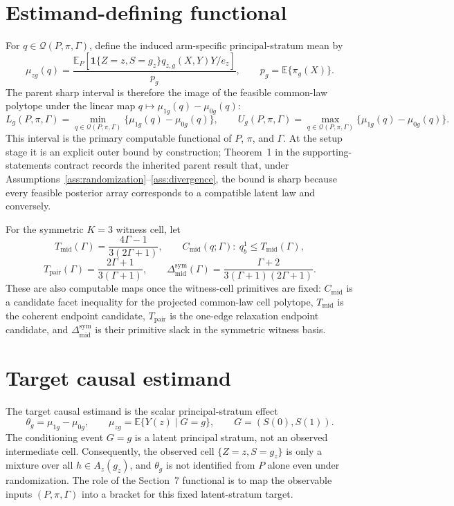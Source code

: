 \documentclass[11pt]{article}
\newcommand{\E}{\mathbb{E}}
\newcommand{\one}{\mathbf{1}}
\theoremstyle{definition}
\theoremstyle{plain}
\theoremstyle{remark}
\begin{document}
\section{Estimand-defining functional}
For \(q\in\mathcal Q(P,\pi,\Gamma)\), define the induced arm-specific principal-stratum mean by
\[
  \mu_{zg}(q)
  =
  \frac{\E_P\!\left[\one\{Z=z,S=g_z\}q_{z,g}(X,Y)Y/e_z\right]}{p_g},
  \qquad
  p_g=\E\{\pi_g(X)\}.
\]
The parent sharp interval is therefore the image of the feasible common-law polytope under the linear map \(q\mapsto \mu_{1g}(q)-\mu_{0g}(q)\):
\[
  L_g(P,\pi,\Gamma)
  =
  \min_{q\in\mathcal Q(P,\pi,\Gamma)}\{\mu_{1g}(q)-\mu_{0g}(q)\},
  \qquad
  U_g(P,\pi,\Gamma)
  =
  \max_{q\in\mathcal Q(P,\pi,\Gamma)}\{\mu_{1g}(q)-\mu_{0g}(q)\}.
\]
This interval is the primary computable functional of \(P\), \(\pi\), and \(\Gamma\).  At the setup stage it is an explicit outer bound by construction; Theorem~1 in the supporting-statements contract records the inherited parent result that, under Assumptions~\ref{ass:randomization}--\ref{ass:divergence}, the bound is sharp because every feasible posterior array corresponds to a compatible latent law and conversely.

For the symmetric \(K=3\) witness cell, let
\[
  T_{\mathrm{mid}}(\Gamma)=\frac{4\Gamma-1}{3(2\Gamma+1)},\qquad
  C_{\mathrm{mid}}(q;\Gamma):\ q_b^1\le T_{\mathrm{mid}}(\Gamma),
\]
\[
  T_{\mathrm{pair}}(\Gamma)=\frac{2\Gamma+1}{3(\Gamma+1)},
  \qquad
  \Delta_{\mathrm{mid}}^{\mathrm{sym}}(\Gamma)=\frac{\Gamma+2}{3(\Gamma+1)(2\Gamma+1)}.
\]
These are also computable maps once the witness-cell primitives are fixed: \(C_{\mathrm{mid}}\) is a candidate facet inequality for the projected common-law cell polytope, \(T_{\mathrm{mid}}\) is the coherent endpoint candidate, \(T_{\mathrm{pair}}\) is the one-edge relaxation endpoint candidate, and \(\Delta_{\mathrm{mid}}^{\mathrm{sym}}\) is their primitive slack in the symmetric witness basis.

\section{Target causal estimand}
The target causal estimand is the scalar principal-stratum effect
\[
  \theta_g=\mu_{1g}-\mu_{0g},
  \qquad
  \mu_{zg}=\E\{Y(z)\mid G=g\},
  \qquad
  G=(S(0),S(1)).
\]
The conditioning event \(G=g\) is a latent principal stratum, not an observed intermediate cell.  Consequently, the observed cell \(\{Z=z,S=g_z\}\) is only a mixture over all \(h\in A_z(g_z)\), and \(\theta_g\) is not identified from \(P\) alone even under randomization.  The role of the Section~7 functional is to map the observable inputs \((P,\pi,\Gamma)\) into a bracket for this fixed latent-stratum target.
\end{document}
